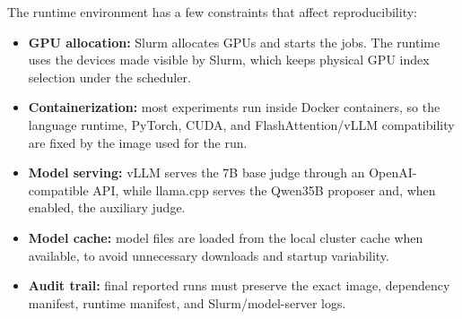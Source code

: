 \documentclass[12pt,a4paper,twoside,openright]{book}
\begin{document}
The runtime environment has a few constraints that affect reproducibility:
\begin{itemize}
    \item \textbf{GPU allocation:} Slurm allocates GPUs and starts the jobs. The
    runtime uses the devices made visible by Slurm, which keeps physical GPU index
    selection under the scheduler.
    \item \textbf{Containerization:} most experiments run inside Docker
    containers, so the language runtime, PyTorch, CUDA, and FlashAttention/vLLM
    compatibility are fixed by the image used for the run.
    \item \textbf{Model serving:} vLLM serves the 7B base judge through an
    OpenAI-compatible API, while llama.cpp serves the Qwen35B proposer and, when
    enabled, the auxiliary judge.
    \item \textbf{Model cache:} model files are loaded from the local cluster
    cache when available, to avoid unnecessary downloads and startup variability.
    \item \textbf{Audit trail:} final reported runs must preserve the exact
    image, dependency manifest, runtime manifest, and Slurm/model-server logs.
\end{itemize}
\end{document}
